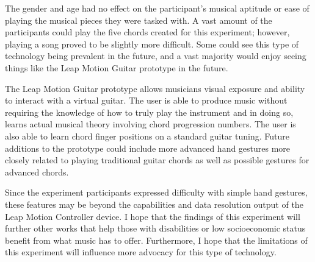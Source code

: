 \documentclass{vgtc}                          %
\begin{document}
The gender and age had no effect on the participant's musical aptitude or ease of playing the musical pieces they were tasked with. A vast amount of the participants could play the five chords created for this experiment; however, playing a song proved to be slightly more difficult. Some could see this type of technology being prevalent in the future, and a vast majority would enjoy seeing things like the Leap Motion Guitar prototype in the future.  

The Leap Motion Guitar prototype allows musicians visual exposure and ability to interact with a virtual guitar. The user is able to produce music without requiring the knowledge of how to truly play the instrument and in doing so, learns actual musical theory involving chord progression numbers. The user is also able to learn chord finger positions on a standard guitar tuning. Future additions to the prototype could include more advanced hand gestures more closely related to playing traditional guitar chords as well as possible gestures for advanced chords. 

Since the experiment participants expressed difficulty with simple hand gestures, these features may be beyond the capabilities and data resolution output of the Leap Motion Controller device. I hope that the findings of this experiment will further other works that help those with disabilities or low socioeconomic status benefit from what music has to offer. Furthermore, I hope that the limitations  of this experiment will influence more advocacy for this type of technology.


%

%
%
%


\end{document}
